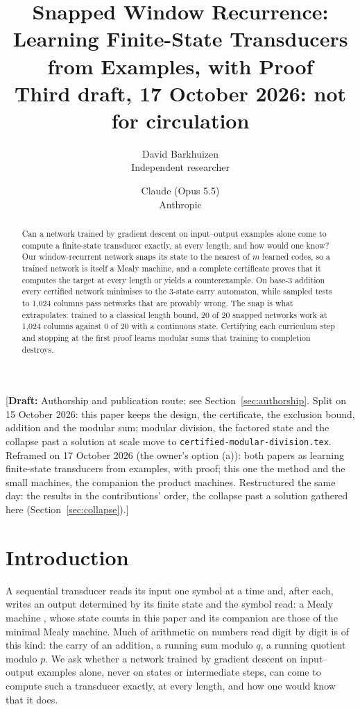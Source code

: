 \documentclass[11pt]{article}
\title{Snapped Window Recurrence:\\Learning Finite-State Transducers from Examples, with Proof\\[0.5em]
\large Third draft, 17 October 2026: not for circulation}
\author{
  David Barkhuizen\\
  Independent researcher
  \and
  Claude (Opus 5.5)\\
  Anthropic
}
\date{}
\newcommand{\draftnote}[1]{\textcolor{red!70!black}{[\textbf{Draft:} #1]}}
\begin{document}
\maketitle

\draftnote{Authorship and publication route: see Section~\ref{sec:authorship}. Split on 15 October
2026: this paper keeps the design, the certificate, the exclusion bound, addition and the modular
sum; modular division, the factored state and the collapse past a solution at scale move to
\texttt{certified-modular-division.tex}. Reframed on 17 October 2026 (the owner's option (a)): both
papers as learning finite-state transducers from examples, with proof; this one the method and the
small machines, the companion the product machines. Restructured the same day: the results in the contributions' order, the
collapse past a solution gathered here (Section~\ref{sec:collapse}).}

\begin{abstract}
Can a network trained by gradient descent on input--output examples alone come to compute a
finite-state transducer exactly, at every length, and how would one know? Our window-recurrent
network snaps its state to the nearest of $m$ learned codes, so a trained network is itself a Mealy
machine, and a complete certificate proves that it computes the target at every length or yields a
counterexample. On base-3 addition every certified network minimises to the 3-state carry
automaton, while sampled tests to 1{,}024 columns pass networks that are provably wrong. The snap is
what extrapolates: trained to a classical length bound, 20 of 20 snapped networks work at 1{,}024
columns against 0 of 20 with a continuous state. Certifying each curriculum step and stopping at the
first proof learns modular sums that training to completion destroys.
\end{abstract}

\section{Introduction}

A sequential transducer reads its input one symbol at a time and, after each, writes an output
determined by its finite state and the symbol read: a Mealy machine \citep{mealy-1955-synthesizing},
whose state counts in this paper and its companion are those of the minimal Mealy machine. Much of arithmetic on numbers read
digit by digit is of this kind: the carry of an addition, a running sum modulo $q$, a running
quotient modulo $p$. We ask whether a network trained by gradient descent on input--output examples
alone, never on states or intermediate steps, can come to compute such a transducer exactly, at
every length, and how one would know that it does.
\end{document}

